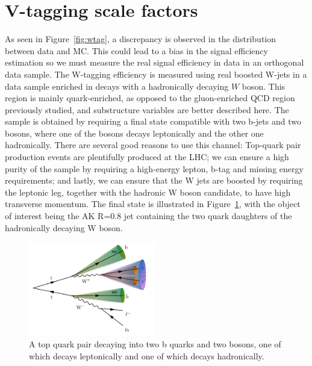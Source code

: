 \section{V-tagging scale factors}
\label{sec:searchI:vtag}
As seen in Figure~\ref{fig:wtag}, a discrepancy is observed in the \nsubj distribution between data and MC. This could lead to a bias in the signal efficiency estimation so we must measure the real signal efficiency in data in an orthogonal data sample.
The W-tagging efficiency is measured using real boosted W-jets in a data sample enriched in \ttbar decays with a hadronically decaying $W$ boson. This region is mainly quark-enriched, as opposed to the gluon-enriched QCD region previously studied, and substructure variables are better described here. The sample is obtained by requiring a final state compatible with two b-jets and two \PW bosons, where one of the bosons decays leptonically and the other one hadronically. There are several good reasons to use this channel: Top-quark pair production events are plentifully produced at the LHC; we can ensure a high purity of the sample by requiring a high-energy lepton, b-tag and missing energy requirements; and lastly, we can ensure that the W jets are boosted by requiring the leptonic leg, together with the hadronic W boson candidate, to have high transverse momentum. The final state is illustrated in Figure~\ref{fig:search2:ttsemilep}, with the object of interest being the AK R=0.8 jet containing the two quark daughters of the hadronically decaying W boson.
\begin{figure}[h!]
\centering
\includegraphics[width=0.49\textwidth]{figures/analysis/search2/misc/semileptt.pdf}
\caption{A top quark pair decaying into two b quarks and two \PW bosons, one of which decays leptonically and one of which decays hadronically.}
\label{fig:search2:ttsemilep}
\end{figure}

